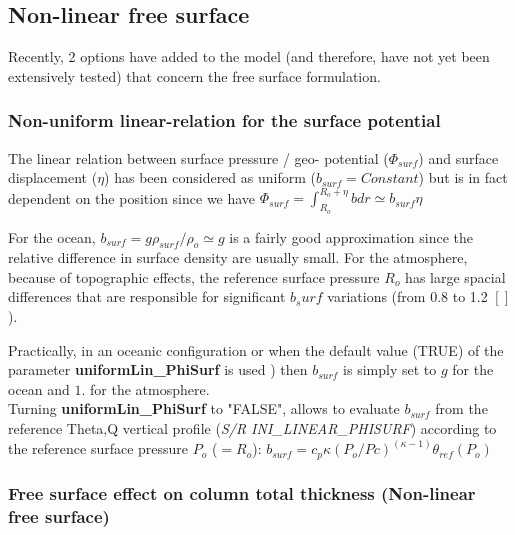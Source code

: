 

\subsection{Non-linear free surface}

Recently, 2 options have added to the model
(and therefore, have not yet been extensively tested)
that concern the free surface formulation.

\subsubsection{Non-uniform linear-relation for the surface potential}

The linear relation between 
surface pressure / geo- potential ($\Phi_{surf}$)
and surface displacement ($\eta$)
has been considered as uniform ($b_{surf} = Constant$)
but is in fact
dependent on the position 
since we have 
$\Phi_{surf}=\int_{R_o}^{R_o+\eta} b dr \simeq b_{surf} \eta$

For the ocean, $b_{surf} = g \rho_{surf} / \rho_o \simeq g$
is a fairly good approximation since the relative difference
in surface density are usually small.
For the atmosphere, because of topographic effects,
the reference surface pressure $R_o$ has large spacial differences
that are responsible for significant $b_surf$ variations
(from 0.8 to 1.2 $[]$).

Practically, in an oceanic configuration or
when the default value (TRUE) of the parameter {\bf uniformLin\_PhiSurf}
is used ) 
then $b_{surf}$ is simply set to $g$ for the ocean
and $1.$ for the atmosphere.\\
Turning {\bf uniformLin\_PhiSurf} to "FALSE", allows to
evaluate $b_{surf}$ from the reference Theta,Q vertical profile
({\it S/R INI\_LINEAR\_PHISURF})
according to the reference surface pressure $P_o$ ($=R_o$):
$b_{surf} = c_p \kappa (P_o / Pc)^{(\kappa - 1)} \theta_{ref}(P_o)$

\subsubsection{Free surface effect on column total thickness
(Non-linear free surface)}

